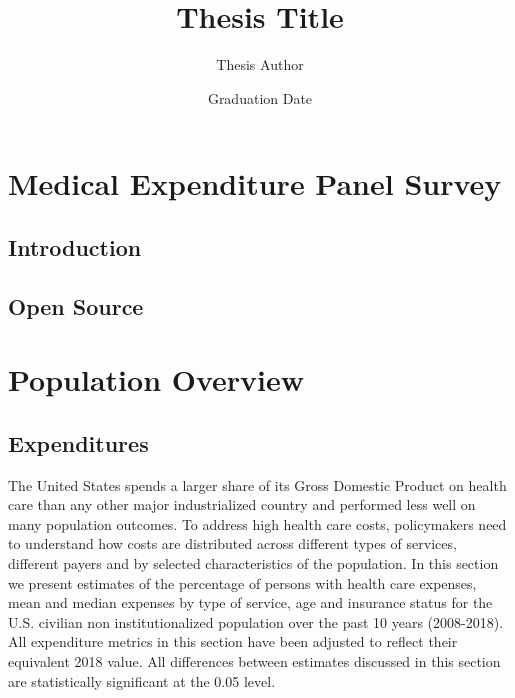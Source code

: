 \documentclass{ucetd}
\title{Thesis Title}
\author{Thesis Author}
\date{Graduation Date}
\begin{document}
\maketitle

\makecopyright
\makededication
\makeepigraph

\tableofcontents
\listoffigures
\listoftables

\acknowledgments

\abstract

\mainmatter

\chapter{Medical Expenditure Panel Survey}
\section{Introduction}
\section{Open Source}

\chapter{Population Overview}
\section{Expenditures} \label{sec_expenditures}
The United States spends a larger share of its Gross Domestic Product on health care than any other major industrialized country and performed less well on many population outcomes.\cite{papanicolas} To address high health care costs, policymakers need to understand how costs are distributed across different types of services, different payers and by selected characteristics of the population. In this section we present estimates of the percentage of persons with health care expenses, mean and median expenses by type of service, age and insurance status for the U.S. civilian non institutionalized population over the past 10 years (2008-2018). All expenditure metrics in this section have been adjusted to reflect their equivalent 2018 value. All differences between estimates discussed in this section are statistically significant at the 0.05 level.
\end{document}
